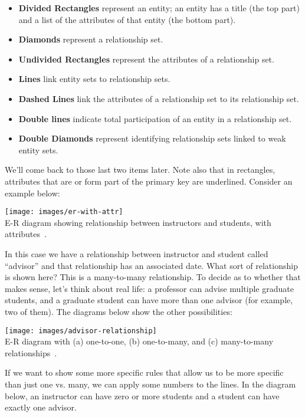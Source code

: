 \documentclass[a4paper]{report}
\begin{document}
\begin{itemize}
	\item \textbf{Divided Rectangles} represent an entity; an entity has a title (the top part) and a list of the attributes of that entity (the bottom part).
	\item \textbf{Diamonds} represent a relationship set.
	\item \textbf{Undivided Rectangles} represent the attributes of a relationship set. 
	\item \textbf{Lines} link entity sets to relationship sets.
	\item \textbf{Dashed Lines} link the attributes of a relationship set to its relationship set.
	\item \textbf{Double lines} indicate total participation of an entity in a relationship set.
	\item \textbf{Double Diamonds} represent identifying relationship sets linked to weak entity sets.
\end{itemize}

We'll come back to those last two items later. Note also that in rectangles, attributes that are or form part of the primary key are underlined. Consider an example below:

\begin{center}
\texttt{[image: images/er-with-attr]}\\
E-R diagram showing relationship between instructors and students, with attributes~\cite{dsc}.
\end{center}

In this case we have a relationship between instructor and student called ``advisor'' and that relationship has an associated date. What sort of relationship is shown here? This is a many-to-many relationship. To decide as to whether that makes sense, let's think about real life: a professor can advise multiple graduate students, and a graduate student can have more than one advisor (for example, two of them). The diagrams below show the other possibilities:

\begin{center}
\texttt{[image: images/advisor-relationship]}\\
E-R diagram with (a) one-to-one, (b) one-to-many, and (c) many-to-many relationships~\cite{dsc}.
\end{center}

If we want to show some more specific rules that allow us to be more specific than just one vs. many, we can apply some numbers to the lines. In the diagram below, an instructor can have zero or more students and a student can have exactly one advisor.
\end{document}
